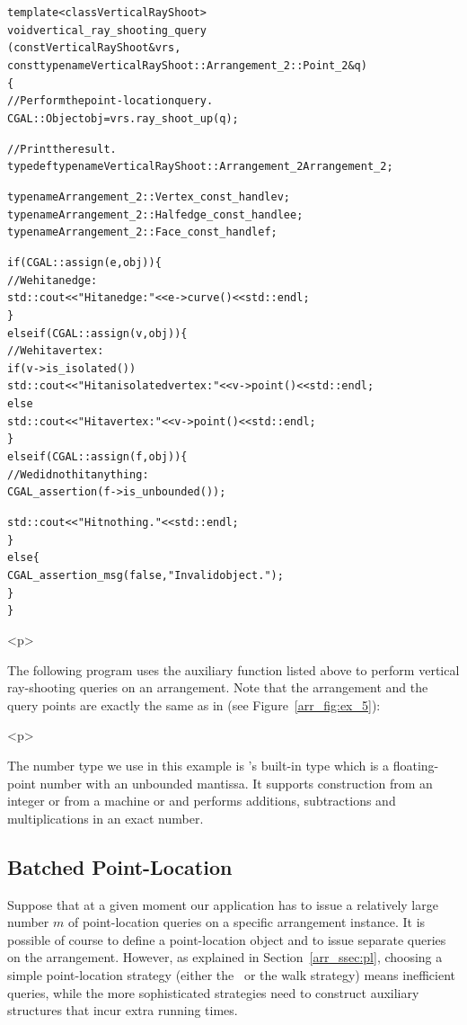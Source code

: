 \begin{alltt}
template <class VerticalRayShoot>
void vertical_ray_shooting_query
    (const VerticalRayShoot& vrs,
     const typename VerticalRayShoot::Arrangement_2::Point_2& q)
\{
  // Perform the point-location query.
  CGAL::Object    obj = vrs.ray_shoot_up (q);

  // Print the result.
  typedef typename VerticalRayShoot::Arrangement_2  Arrangement_2;

  typename Arrangement_2::Vertex_const_handle    v;
  typename Arrangement_2::Halfedge_const_handle  e;
  typename Arrangement_2::Face_const_handle      f;

  if (CGAL::assign (e, obj)) \{
    // We hit an edge:
    std::cout << "Hit an edge: " << e->curve() << std::endl;
  \}
  else if (CGAL::assign (v, obj)) \{
    // We hit a vertex:
    if (v->is_isolated())
      std::cout << "Hit an isolated vertex: " << v->point() << std::endl;
    else
      std::cout << "Hit a vertex: " << v->point() << std::endl;
  \}
  else if (CGAL::assign (f, obj)) \{
    // We did not hit anything:
    CGAL_assertion (f->is_unbounded());
    
    std::cout << "Hit nothing." << std::endl; 
  \}
  else \{
    CGAL_assertion_msg (false, "Invalid object.");
  \}
\}
\end{alltt}

\begin{ccHtmlOnly}<p>\end{ccHtmlOnly}
The following program uses the auxiliary function listed above to
perform vertical ray-shooting queries on an arrangement. Note that
the arrangement and the query points are exactly the same as in
 (see Figure~\ref{arr_fig:ex_5}):


\begin{ccHtmlOnly}<p>\end{ccHtmlOnly}
The number type we use in this example is \cgal's built-in
 type which is a floating-point number with an
unbounded mantissa. It supports construction from an integer or
from a machine  or  and performs additions,
subtractions and multiplications in an exact number.

\subsection{Batched Point-Location}
\label{arr_ssec:batched_pl}
%
Suppose that at a given moment our application has to issue a
relatively large number $m$ of point-location queries on a
specific arrangement instance. It is possible of course to define
a point-location object and to issue separate queries on the
arrangement. However, as explained in Section~\ref{arr_ssec:pl},
choosing a simple point-location strategy (either the \naive\ or
the walk strategy) means inefficient queries, while the more
sophisticated strategies need to construct auxiliary structures
that incur extra running times.

